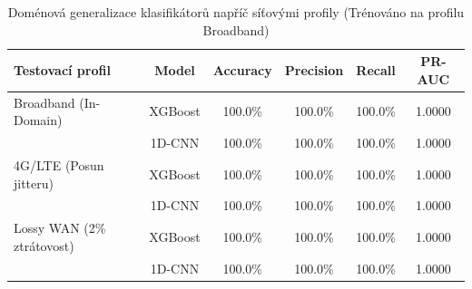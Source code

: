 \begin{table}[htbp]
\centering
\caption{Doménová generalizace klasifikátorů napříč síťovými profily (Trénováno na profilu Broadband)}
\label{tab:cross_profile_generalization}
\begin{tabular}{lccccc}
\hline
\textbf{Testovací profil} & \textbf{Model} & \textbf{Accuracy} & \textbf{Precision} & \textbf{Recall} & \textbf{PR-AUC} \\
\hline
Broadband (In-Domain) & XGBoost & 100.0\% & 100.0\% & 100.0\% & 1.0000 \\
 & 1D-CNN & 100.0\% & 100.0\% & 100.0\% & 1.0000 \\
\hline
4G/LTE (Posun jitteru) & XGBoost & 100.0\% & 100.0\% & 100.0\% & 1.0000 \\
 & 1D-CNN & 100.0\% & 100.0\% & 100.0\% & 1.0000 \\
\hline
Lossy WAN (2\% ztrátovost) & XGBoost & 100.0\% & 100.0\% & 100.0\% & 1.0000 \\
 & 1D-CNN & 100.0\% & 100.0\% & 100.0\% & 1.0000 \\
\hline
\end{tabular}
\end{table}
